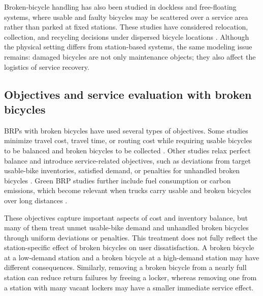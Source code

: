 Broken-bicycle handling has also been studied in dockless and free-floating systems, where usable and faulty bicycles may be scattered over a service area rather than parked at fixed stations. These studies have considered relocation, collection, and recycling decisions under dispersed bicycle locations \citep{changInnovativeBikeSharingChina2018,usamaFreefloatingBikeRepositioning2019,usamaDocklessBikesharingSystem2020,changRelocatingOperationalDamaged2021,changSmartPredictthenoptimizeMethod2023a}. Although the physical setting differs from station-based systems, the same modeling issue remains: damaged bicycles are not only maintenance objects; they also affect the logistics of service recovery.

\subsection{Objectives and service evaluation with broken bicycles}

BRPs with broken bicycles have used several types of objectives. Some studies minimize travel cost, travel time, or routing cost while requiring usable bicycles to be balanced and broken bicycles to be collected \citep{alvarez-valdesOptimizingLevelService2016,luBrokenBikeRecycling2019,zhangBikeSharingStaticRebalancing2018,zhangAdaptiveTabuSearch2020}. Other studies relax perfect balance and introduce service-related objectives, such as deviations from target usable-bike inventories, satisfied demand, or penalties for unhandled broken bicycles \citep{xuBikeRepositioningProblem2019,wangEnhancedArtificialBee2021,caiDynamicBicycleRelocation2022}. Green BRP studies further include fuel consumption or carbon emissions, which become relevant when trucks carry usable and broken bicycles over long distances \citep{wangStaticGreenRepositioning2018,wangEnhancedArtificialBee2021,changSmartPredictthenoptimizeMethod2023a}.

These objectives capture important aspects of cost and inventory balance, but many of them treat unmet usable-bike demand and unhandled broken bicycles through uniform deviations or penalties. This treatment does not fully reflect the station-specific effect of broken bicycles on user dissatisfaction. A broken bicycle at a low-demand station and a broken bicycle at a high-demand station may have different consequences. Similarly, removing a broken bicycle from a nearly full station can reduce return failures by freeing a locker, whereas removing one from a station with many vacant lockers may have a smaller immediate service effect.


